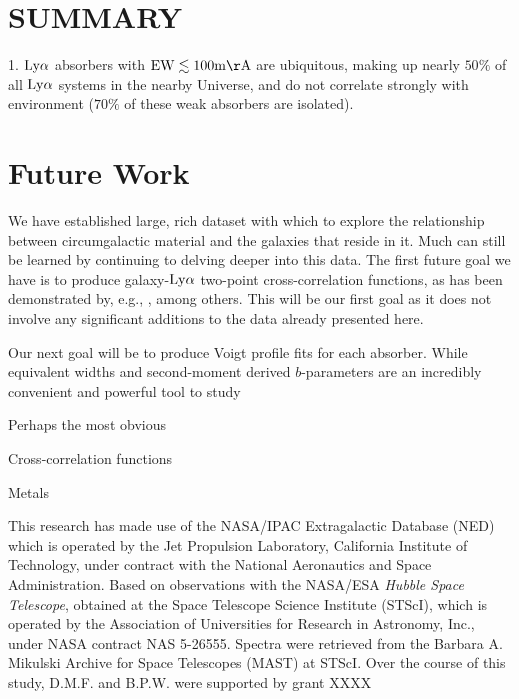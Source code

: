 \documentclass[twocolumn,tighten]{aastex62}
\begin{document}
\section{SUMMARY}
1. $\rm Ly\alpha$ absorbers with $\rm EW \lesssim 100 m\AA$ are ubiquitous, making up nearly $50\%$ of all $\rm Ly\alpha$ systems in the nearby Universe, and do not correlate strongly with environment ($70\%$ of these weak absorbers are isolated). 




\section{Future Work}

We have established large, rich dataset with which to explore the relationship between circumgalactic material and the galaxies that reside in it. Much can still be learned by continuing to delving deeper into this data. The first future goal we have is to produce galaxy-$\rm Ly\alpha$ two-point cross-correlation functions, as has been demonstrated by, e.g., \cite{chen2005}, among others. This will be our first goal as it does not involve any significant additions to the data already presented here.

Our next goal will be to produce Voigt profile fits for each absorber. While equivalent widths and second-moment derived $b$-parameters are an incredibly convenient and powerful tool to study



Perhaps the most obvious 


Cross-correlation functions \cite{chen2005}

Metals








\acknowledgements

This research has made use of the NASA/IPAC Extragalactic Database (NED) which is operated by the Jet Propulsion Laboratory, California Institute of Technology, under contract with the National Aeronautics and Space Administration. Based on observations with the NASA/ESA \textit{Hubble Space Telescope}, obtained at the Space Telescope Science Institute (STScI), which is operated by the Association of Universities for Research in Astronomy, Inc., under NASA contract NAS 5-26555. Spectra were retrieved from the Barbara A. Mikulski Archive for Space Telescopes (MAST) at STScI. Over the course of this study, D.M.F. and B.P.W. were supported by grant XXXX
\end{document}
